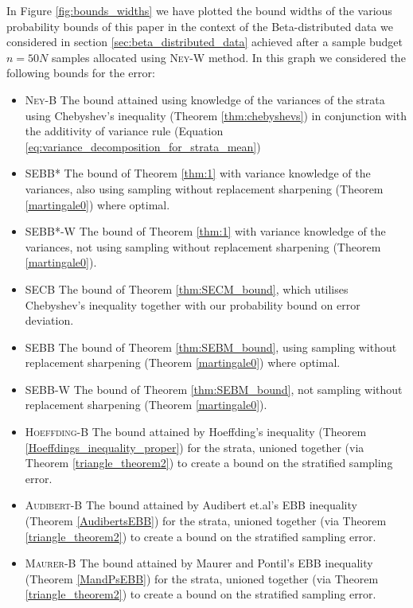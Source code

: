 In Figure \ref{fig:bounds_widths} we have plotted the bound widths of the various probability bounds of this paper in the context of the Beta-distributed data we considered in section \ref{sec:beta_distributed_data} achieved after a sample budget $n=50N$ samples allocated using \textsc{Ney-W} method.
In this graph we considered the following bounds for the error:

\begin{itemize}
\item 
\textsc{Ney-B} The bound attained using knowledge of the variances of the strata using Chebyshev's inequality (Theorem \ref{thm:chebyshevs}) in conjunction with the additivity of variance rule (Equation \ref{eq:variance_decomposition_for_strata_mean})
\item 
\textsc{SEBB*} The bound of Theorem \ref{thm:1} with variance knowledge of the variances, also using sampling without replacement sharpening (Theorem \ref{martingale0}) where optimal.
\item 
\textsc{SEBB*-W} The bound of Theorem \ref{thm:1} with variance knowledge of the variances, not using sampling without replacement sharpening (Theorem \ref{martingale0}).
\item 
\textsc{SECB} The bound of Theorem \ref{thm:SECM_bound}, which utilises Chebyshev's inequality together with our probability bound on error deviation.
\item 
\textsc{SEBB} The bound of Theorem \ref{thm:SEBM_bound}, using sampling without replacement sharpening (Theorem \ref{martingale0}) where optimal.
\item 
\textsc{SEBB-W} The bound of Theorem \ref{thm:SEBM_bound}, not sampling without replacement sharpening (Theorem \ref{martingale0}).
\item 
\textsc{Hoeffding-B} The bound attained by Hoeffding's inequality (Theorem \ref{Hoeffdings_inequality_proper}) for the strata, unioned together (via Theorem \ref{triangle_theorem2}) to create a bound on the stratified sampling error.
\item 
\textsc{Audibert-B} The bound attained by Audibert et.al's EBB inequality (Theorem \ref{AudibertsEBB}) for the strata, unioned together (via Theorem \ref{triangle_theorem2}) to create a bound on the stratified sampling error.
\item 
\textsc{Maurer-B} The bound attained by Maurer and Pontil's EBB inequality (Theorem \ref{MandPsEBB}) for the strata, unioned together (via Theorem \ref{triangle_theorem2}) to create a bound on the stratified sampling error.
\end{itemize}

